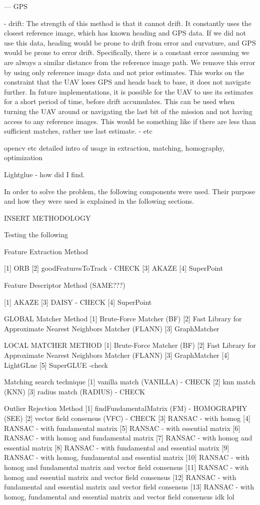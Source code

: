  --- GPS 

- drift: The strength of this method is that it cannot drift. It constantly uses the closest reference image, which has known heading and GPS data. If we did not use this data, heading would be prone to drift from error and curvature, and GPS would be prone to error drift. Specifically, there is a constant error assuming we are always a similar distance from the reference image path. We remove this error by using only reference image data and not prior estimates. This works on the constraint that the UAV loses GPS and heads back to base, it does not navigate further. In future implementations, it is possible for the UAV to use its estimates for a short period of time, before drift accumulates. This can be used when turning the UAV around or navigating the last bit of the mission and not having access to any reference images. This would be something like if there are less than sufficient matches, rather use last estimate. 
- etc


opencv etc
detailed intro of usage in extraction, matching, homography, optimization

Lightglue - how did I find. 


In order to solve the problem, the following components were used. Their purpose and how they were used is explained in the following sections.

INSERT METHODOLOGY


Testing the following

Feature Extraction Method

[1] ORB
[2] goodFeaturesToTrack - CHECK
[3] AKAZE
[4] SuperPoint

Feature Descriptor Method (SAME???)

[1] AKAZE
[3] DAISY - CHECK
[4] SuperPoint

GLOBAL Matcher Method
[1] Brute-Force Matcher (BF)
[2] Fast Library for Approximate Nearest Neighbors Matcher (FLANN)
[3] GraphMatcher


LOCAL MATCHER METHOD
[1] Brute-Force Matcher (BF)
[2] Fast Library for Approximate Nearest Neighbors Matcher (FLANN)
[3] GraphMatcher
[4] LightGLue
[5] SuperGLUE -check


Matching search technique
[1] vanilla match (VANILLA) -  CHECK
[2] knn match (KNN)
[3] radius match (RADIUS) - CHECK

Outlier Rejection Method
[1] findFundamentalMatrix (FM) - HOMOGRAPHY (SEE)
[2] vector field consensus (VFC) - CHECK
[3] RANSAC - with homog
[4] RANSAC - with fundamental matrix
[5] RANSAC - with essential matrix
[6] RANSAC - with homog and fundamental matrix
[7] RANSAC - with homog and essential matrix
[8] RANSAC - with fundamental and essential matrix
[9] RANSAC - with homog, fundamental and essential matrix
[10] RANSAC - with homog and fundamental matrix and vector field consensus
[11] RANSAC - with homog and essential matrix and vector field consensus
[12] RANSAC - with fundamental and essential matrix and vector field consensus
[13] RANSAC - with homog, fundamental and essential matrix and vector field consensus
idk lol




